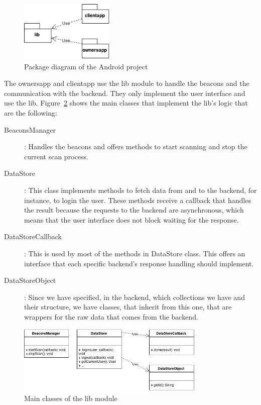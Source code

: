 \begin{figure}[!ht]
  \centering
    \includegraphics[width=0.4\textwidth]{figures/package_diagram_android}
    \caption{Package diagram of the Android project}
    \label{fig:package_diagram_android}
\end{figure}

The ownersapp and clientapp use the lib module to handle the beacons and
the communication with the backend. They only implement the user interface
and use the lib. Figure~\ref{fig:android-uml} shows the main classes
that implement the lib's logic that are the following:
\begin{description}
  \item[BeaconsManager]: Handles the beacons and offers methods to
  start scanning and stop the current scan process.
  \item[DataStore]: This class implements methods to fetch data from and to
  the backend, for instance, to login the user. These methods receive a callback
  that handles the result because the requests to the backend are asynchronous,
  which means that the user interface does not block waiting for the
  response.
  \item[DataStoreCallback]: This is used by most of the methods in DataStore
  class. This offers an interface that each specific backend's response
  handling should implement.
  \item[DataStoreObject]: Since we have specified, in the backend, which
  collections we have and their structure, we have classes, that inherit from
  this one, that are wrappers for the raw data that comes from the backend.
\end{description}

\begin{figure}[!ht]
  \centering
    \includegraphics[width=0.8\textwidth]{figures/android-uml}
    \caption{Main classes of the lib module}
    \label{fig:android-uml}
\end{figure}

